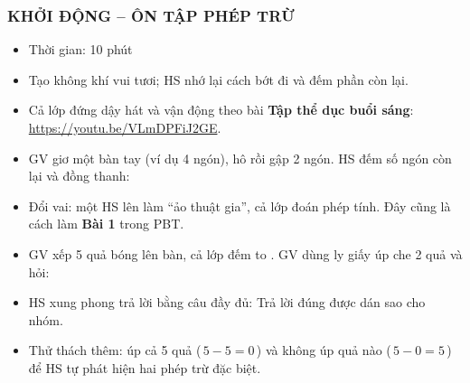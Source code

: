 \documentclass[../main.tex]{subfiles}
\begin{document}
\subsubsection{KHỞI ĐỘNG -- ÔN TẬP PHÉP TRỪ}
\begin{hd}
    \begin{itemize}
        \item Thời gian: 10 phút
        \item Tạo không khí vui tươi; HS nhớ lại cách bớt đi và đếm phần còn lại.
    \end{itemize}
\end{hd}
\begin{itemize}
    \item Cả lớp đứng dậy hát và vận động theo bài \textbf{Tập thể dục buổi sáng}: \url{https://youtu.be/VLmDPFiJ2GE}.
\end{itemize}
\begin{itemize}
    \item GV giơ một bàn tay (ví dụ 4 ngón), hô  rồi gập 2 ngón. HS đếm số ngón còn lại và đồng thanh: 
    \item Đổi vai: một HS lên làm “ảo thuật gia”, cả lớp đoán phép tính. Đây cũng là cách làm \textbf{Bài 1} trong PBT.
\end{itemize}
\GAhinh
{\centering{}\hspace{1.2cm}\par}
\begin{itemize}
    \item GV xếp 5 quả bóng lên bàn, cả lớp đếm to . GV dùng ly giấy úp che 2 quả và hỏi: 
    \item HS xung phong trả lời bằng câu đầy đủ:  Trả lời đúng được dán sao cho nhóm.
    \item Thử thách thêm: úp cả 5 quả (\,$5 - 5 = 0$\,) và không úp quả nào (\,$5 - 0 = 5$\,) để HS tự phát hiện hai phép trừ đặc biệt.
\end{itemize}
\GAhinh
\end{document}
